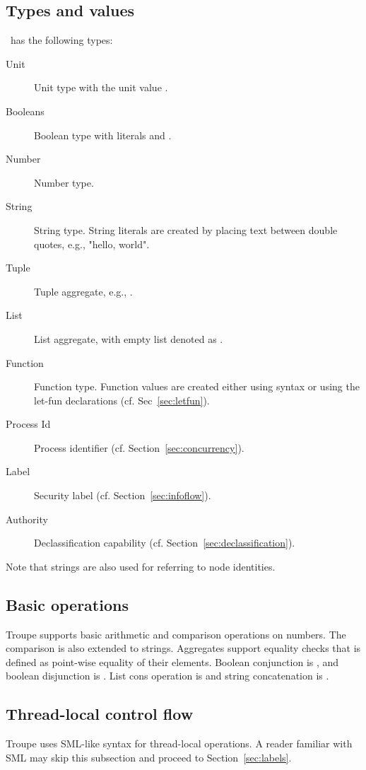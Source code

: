 \subsection{Types and values}
\troupelang\ has the following types:
\begin{description}
\item [Unit] Unit type with the unit value \textcode{()}.
\item [Booleans] Boolean type with literals  and .
\item [Number] Number type.
\item [String] String type. String literals are created by placing text between double quotes, e.g., "hello, world".
\item [Tuple] Tuple aggregate, e.g., .
\item [List] List aggregate, with empty list denoted as \textcode{[]}.
\item [Function] Function type. Function values are created either using  syntax or using the let-fun declarations (cf. Sec~\ref{sec:letfun}).
\item [Process Id] Process identifier (cf. Section~\ref{sec:concurrency}).
\item [Label] Security label (cf. Section~\ref{sec:infoflow}).
\item [Authority] Declassification capability (cf. Section~\ref{sec:declassification}).
\end{description}
Note that strings are also used for referring to node identities.


\subsection{Basic operations}
Troupe supports basic arithmetic and comparison operations on numbers. The comparison is also extended to strings.
Aggregates support equality checks that is defined as point-wise equality of their elements. Boolean conjunction is
, and boolean disjunction is . List cons operation is \textcode{::} and
string concatenation is {\textcode{\^{}}}.


\subsection{Thread-local control flow}
Troupe uses SML-like syntax for thread-local operations. A reader familiar
with SML may skip this subsection and proceed to  Section~\ref{sec:labels}.


